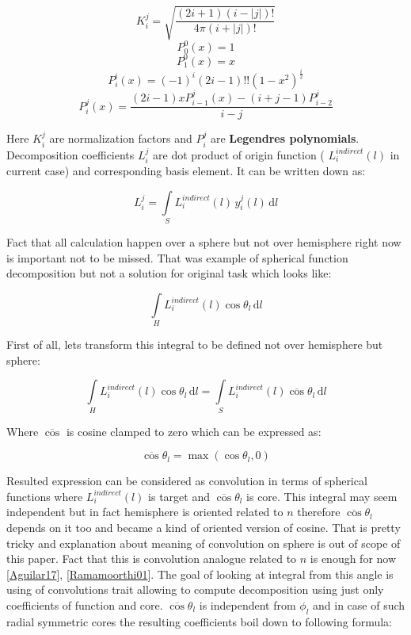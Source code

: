 \[K_i^j = \sqrt{\frac{(2i+1)(i-|j|)!}{4\pi(i+|j|)!}}\] \[P_0^0(x) = 1\] \[P_1^0(x) = x\] \[P_i^i(x) = (-1)^i(2i-1)!!(1-x^2)^\frac{i}{2}\] \[P_i^j(x) = \frac{(2i-1)xP_{i-1}^j(x) - (i + j - 1)P_{i-2}^j}{i - j}\]

Here $K_i^j$ are normalization factors and $P_i^j$ are {\bfseries Legendre\textquotesingle{}s polynomials}. Decomposition coefficients $L_i^j$ are dot product of origin function ( $L_i^{indirect}(l)$ in current case) and corresponding basis element. It can be written down as\+:

\[L_i^j = \int\limits_S L_i^{indirect}(l)\,y_i^j(l)\, \mathrm{d}l\]

Fact that all calculation happen over a sphere but not over hemisphere right now is important not to be missed. That was example of spherical function decomposition but not a solution for original task which looks like\+:

\[\int\limits_H L_i^{indirect}(l) \cos\theta_l\, \mathrm{d}l\]

First of all, lets transform this integral to be defined not over hemisphere but sphere\+:

\[\int\limits_H L_i^{indirect}(l) \cos\theta_l\, \mathrm{d}l = \int\limits_S L_i^{indirect}(l)\overline{\cos}\theta_l\, \mathrm{d}l\]

Where $\overline{\cos}$ is cosine clamped to zero which can be expressed as\+:

\[\overline{\cos}\theta_l = \max(\cos\theta_l, 0)\]

Resulted expression can be considered as convolution in terms of spherical functions where $L_i^{indirect}(l)$ is target and $\overline{\cos}\theta_l$ is core. This integral may seem independent but in fact hemisphere is oriented related to $n$ therefore $\overline{\cos}\theta_l$ depends on it too and became a kind of \textquotesingle{}oriented\textquotesingle{} version of cosine. That is pretty tricky and explanation about meaning of convolution on sphere is out of scope of this paper. Fact that this is convolution analogue related to $n$ is enough for now \mbox{[}\hyperlink{specification__pbr_math_Aguilar17}{Aguilar17}\mbox{]}, \mbox{[}\hyperlink{specification__pbr_math_Ramamoorthi01}{Ramamoorthi01}\mbox{]}. The goal of looking at integral from this angle is using of convolution\textquotesingle{}s trait allowing to compute decomposition using just only coefficients of function and core. $\overline{\cos}\theta_l$ is independent from $\phi_l$ and in case of such radial symmetric cores the resulting coefficients boil down to following formula\+:

